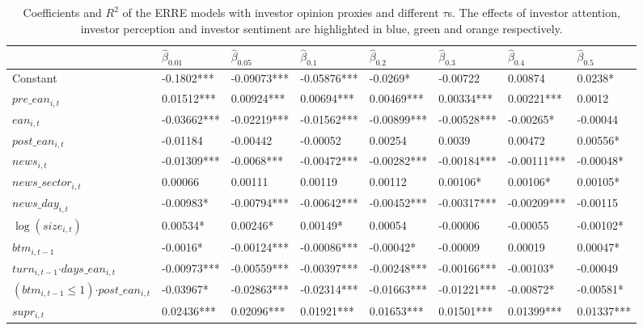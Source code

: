 \documentclass[]{article}
\begin{document}
\begin{small}
\begin{table}

\caption{\label{tab:table1}Coefficients and $R^2$ of the ERRE models with investor opinion proxies and different $\tau$s.
                           The effects of investor attention, investor perception and investor sentiment
                           are highlighted in blue, green and orange respectively.}
\centering
\begin{tabular}[t]{l|l|l|l|l|l|l|l}
\hline
  & $\hat\beta_{0.01}$ & $\hat\beta_{0.05}$ & $\hat\beta_{0.1}$ & $\hat\beta_{0.2}$ & $\hat\beta_{0.3}$ & $\hat\beta_{0.4}$ & $\hat\beta_{0.5}$\\
\hline
Constant & -0.1802*** & -0.09073*** & -0.05876*** & -0.0269* & -0.00722 & 0.00874 & 0.0238*\\
\hline
$pre\_ean_{i,t}$ & 0.01512*** & 0.00924*** & 0.00694*** & 0.00469*** & 0.00334*** & 0.00221*** & 0.0012\\
\hline
$ean_{i,t}$ & -0.03662*** & -0.02219*** & -0.01562*** & -0.00899*** & -0.00528*** & -0.00265* & -0.00044\\
\hline
$post\_ean_{i,t}$ & -0.01184 & -0.00442 & -0.00052 & 0.00254 & 0.0039 & 0.00472 & 0.00556*\\
\hline
$news_{i,t}$& -0.01309*** & -0.0068*** & -0.00472*** & -0.00282*** & -0.00184*** & -0.00111*** & -0.00048*\\
\hline
$news\_sector_{i,t}$& 0.00066 & 0.00111 & 0.00119 & 0.00112 & 0.00106* & 0.00106* & 0.00105*\\
\hline
$news\_day_{i,t}$ & -0.00983* & -0.00794*** & -0.00642*** & -0.00452*** & -0.00317*** & -0.00209*** & -0.00115\\
\hline
$\log(size_{i,t})$ & 0.00534* & 0.00246* & 0.00149* & 0.00054 & -0.00006 & -0.00055 & -0.00102*\\
\hline
$btm_{i,t-1}$  & -0.0016* & -0.00124*** & -0.00086*** & -0.00042* & -0.00009 & 0.00019 & 0.00047*\\
\hline
$turn_{i,t-1}$$\cdot days\_ean_{i,t}$ & -0.00973*** & -0.00559*** & -0.00397*** & -0.00248*** & -0.00166*** & -0.00103* & -0.00049\\
\hline
$(btm_{i,t-1}\leq 1)$$\cdot post\_ean_{i,t}$ & -0.03967* & -0.02863*** & -0.02314*** & -0.01663*** & -0.01221*** & -0.00872* & -0.00581*\\
\hline
$supr_{i,t}$ & 0.02436*** & 0.02096*** & 0.01921*** & 0.01653*** & 0.01501*** & 0.01399*** & 0.01337***\\

\end{tabular}
\end{table}
\end{small}
\end{document}
